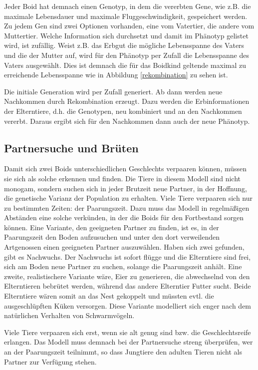 \documentclass[draft=false
              ,paper=a4
              ,twoside=false
              ,fontsize=11pt
              ,headsepline
              ,BCOR10mm
              ,DIV11
              ,bibtotoc
              ,liststotoc
              ]{scrbook}
\begin{document}
Jeder Boid hat demnach einen Genotyp, in dem die vererbten Gene, wie z.B. die maximale Lebensdauer und maximale Fluggeschwindigkeit, gespeichert werden. Zu jedem Gen sind zwei Optionen vorhanden, eine vom Vatertier, die andere vom Muttertier. Welche Information sich durchsetzt und damit im Phänotyp gelistet wird, ist zufällig. Weist z.B. das Erbgut die mögliche Lebensspanne des Vaters und die der Mutter auf, wird für den Phänotyp per Zufall die Lebensspanne des Vaters ausgewählt. Dies ist demnach die für das Boidkind geltende maximal zu erreichende Lebensspanne wie in Abbildung \ref{rekombination} zu sehen ist.

Die initiale Generation wird per Zufall generiert. Ab dann werden neue Nachkommen durch Rekombination erzeugt. Dazu werden die Erbinformationen der Elterntiere, d.h. die Genotypen, neu kombiniert und an den Nachkommen vererbt. Daraus ergibt sich für den Nachkommen dann auch der neue Phänotyp.

\subsection{Partnersuche und Brüten}
Damit sich zwei Boids unterschiedlichen Geschlechts verpaaren können, müssen sie sich als solche erkennen und finden. Die Tiere in diesem Modell sind nicht monogam, sondern suchen sich in jeder Brutzeit neue Partner, in der Hoffnung, die genetische Varianz der Population zu erhalten.
Viele Tiere verpaaren sich nur zu bestimmten Zeiten: der Paarungszeit. Dazu muss das Modell in regelmäßigen Abständen eine solche verkünden, in der die Boids für den Fortbestand sorgen können.
Eine Variante, den geeigneten Partner zu finden, ist es, in der Paarungszeit den Boden aufzusuchen und unter den dort verweilenden Artgenossen einen geeigneten Partner auszuwählen. Haben sich zwei gefunden, gibt es Nachwuchs. Der Nachwuchs ist sofort flügge und die Elterntiere sind frei, sich am Boden neue Partner zu suchen, solange die Paarungszeit anhält.
Eine zweite, realistischere Variante wäre, Eier zu generieren, die abwechselnd von den Elterntieren bebrütet werden, während das andere Elterntier Futter sucht. Beide Elterntiere wären somit an das Nest gekoppelt und müssten evtl. die ausgeschlüpften Küken versorgen. Diese Variante modelliert sich enger nach dem natürlichen Verhalten von Schwarmvögeln.

Viele Tiere verpaaren sich erst, wenn sie alt genug sind bzw. die Geschlechtsreife erlangen. Das Modell muss demnach bei der Partnersuche streng überprüfen, wer an der Paarungszeit teilnimmt, so dass Jungtiere den adulten Tieren nicht als Partner zur Verfügung stehen.
\end{document}
